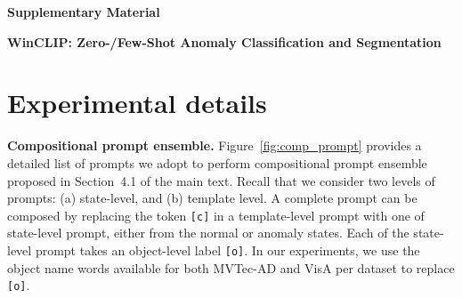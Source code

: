 \onecolumn
\FloatBarrier

\begin{center}
    {\bf {\LARGE Supplementary Material}}
\end{center}
\begin{center}
{\bf {\Large WinCLIP: Zero-/Few-Shot Anomaly Classification and Segmentation}}
\end{center}


\setcounter{figure}{5}
\setcounter{table}{7}

\section{Experimental details}



\noindent\textbf{Compositional prompt ensemble. }
Figure~\ref{fig:comp_prompt} provides a detailed list of prompts we adopt to perform compositional prompt ensemble proposed in Section~4.1 of the main text. Recall that we consider two levels of prompts: \ie (a) state-level, and (b) template level. A complete prompt can be composed by replacing the token \verb|[c]| in a template-level prompt with one of state-level prompt, either from the normal or anomaly states. Each of the state-level prompt takes an object-level label \verb|[o]|. In our experiments, we use the object name words available for both MVTec-AD and VisA per dataset to replace \verb|[o]|. 


